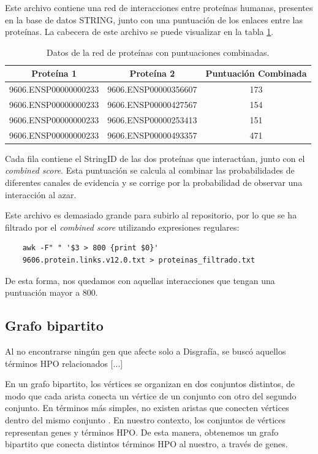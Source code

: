 Este archivo contiene una red de interacciones entre proteínas humanas, presentes en la base de datos STRING, junto con una puntuación de los enlaces entre las proteínas. La cabecera de este archivo se puede visualizar en la tabla \ref{tabla:redProteinas}.


\begin{table}[h]
	\centering
	\caption{Datos de la red de proteínas con puntuaciones combinadas.}
	\label{tabla:redProteinas} 
	\begin{tabular}{|c|c|c|}
		\hline
		\textbf{Proteína 1} & \textbf{Proteína 2} & \textbf{Puntuación Combinada} \\
		\hline
		9606.ENSP00000000233 & 9606.ENSP00000356607 & 173 \\
		9606.ENSP00000000233 & 9606.ENSP00000427567 & 154 \\
		9606.ENSP00000000233 & 9606.ENSP00000253413 & 151 \\
		9606.ENSP00000000233 & 9606.ENSP00000493357 & 471 \\
		\hline
	\end{tabular}
\end{table}

Cada fila contiene el StringID de las dos proteínas que interactúan, junto con el \textit{combined score}. Esta puntuación se calcula al combinar las probabilidades de diferentes canales de evidencia y se corrige por la probabilidad de observar una interacción al azar.

Este archivo es demasiado grande para subirlo al repositorio, por lo que se ha filtrado por el \textit{combined score} utilizando expresiones regulares:

\begin{verbatim}
	awk -F" " '$3 > 800 {print $0}'
	9606.protein.links.v12.0.txt > proteinas_filtrado.txt
\end{verbatim}

De esta forma, nos quedamos con aquellas interacciones que tengan una puntuación mayor a 800.

\subsection{Grafo bipartito}

Al no encontrarse ningún gen que afecte solo a Disgrafía, se buscó aquellos términos HPO relacionados [...]

En un grafo bipartito, los vértices se organizan en dos conjuntos distintos, de modo que cada arista conecta un vértice de un conjunto con otro del segundo conjunto. En términos más simples, no existen aristas que conecten vértices dentro del mismo conjunto \cite{BiRank2017}. En nuestro contexto, los conjuntos de vértices representan genes y términos HPO. De esta manera, obtenemos un grafo bipartito que conecta distintos términos HPO al nuestro, a través de genes. 

